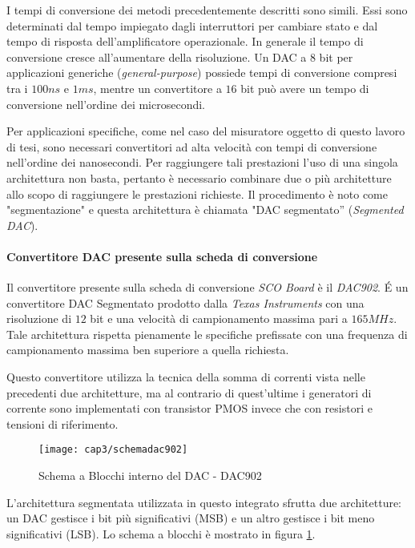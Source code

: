 I tempi di conversione dei metodi precedentemente descritti sono simili. Essi sono determinati dal tempo impiegato dagli interruttori per cambiare stato e dal tempo di risposta dell'amplificatore operazionale. In generale il tempo di conversione cresce all'aumentare della risoluzione. Un DAC a $8$ bit per applicazioni generiche (\textit{general-purpose}) possiede tempi di conversione compresi tra i $100ns$ e $1ms$, mentre un convertitore a $16$ bit può avere un tempo di conversione nell'ordine dei microsecondi.

Per applicazioni specifiche, come nel caso del misuratore oggetto di questo lavoro di tesi, sono necessari convertitori ad alta velocità con tempi di conversione nell'ordine dei nanosecondi. Per raggiungere tali prestazioni l'uso di una singola architettura non basta, pertanto è necessario combinare due o più architetture allo scopo di raggiungere le prestazioni richieste. Il procedimento è noto come "segmentazione" e questa  architettura è chiamata "DAC segmentato” (\textit{Segmented DAC}). 

\paragraph{Convertitore DAC presente sulla scheda di conversione}
Il convertitore presente sulla scheda di conversione \textit{SCO Board} è il \textit{DAC902}. \'E un convertitore DAC Segmentato prodotto dalla \textit{Texas Instruments} con una risoluzione di $12$ bit e una velocità di campionamento massima pari a $165MHz$.
Tale architettura rispetta pienamente le specifiche prefissate con una frequenza di campionamento massima ben superiore a quella richiesta.

Questo convertitore utilizza la tecnica della somma di correnti vista nelle precedenti due architetture, ma al contrario di quest'ultime i generatori di corrente sono implementati con transistor PMOS invece che con resistori e tensioni di riferimento.
\begin{figure}  
  \begin{center}
    \texttt{[image: cap3/schemadac902]}
    \caption{Schema a Blocchi interno del DAC - DAC902}
    \label{schemadac902}
  \end{center}
\end{figure}
L'architettura segmentata utilizzata in questo integrato sfrutta due architetture: un DAC gestisce i bit più significativi (MSB) e un altro gestisce i bit meno significativi (LSB). Lo schema a blocchi è mostrato in figura \ref{schemadac902}.

